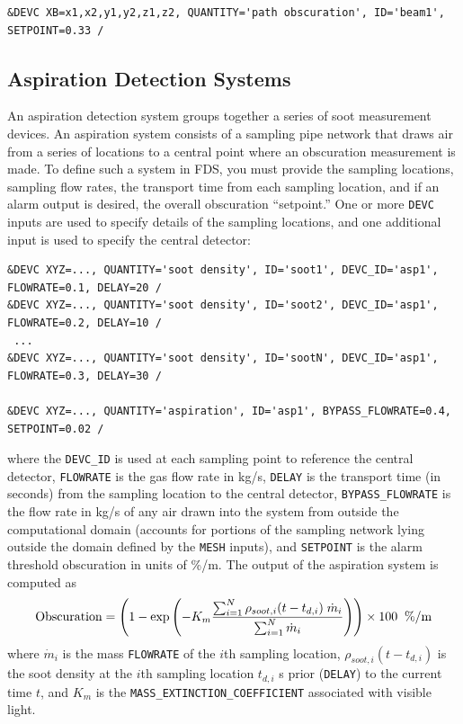 \documentclass[11pt]{book}
\newcommand{\ct}{\tt\small}
\newcommand{\dm}{\dot{m}}
\newcommand{\be}{\begin{equation}}
\newcommand{\ee}{\end{equation}}
\begin{document}
\footnotesize
\begin{verbatim}
&DEVC XB=x1,x2,y1,y2,z1,z2, QUANTITY='path obscuration', ID='beam1', SETPOINT=0.33 /
\end{verbatim}
\normalsize

\subsection{Aspiration Detection Systems}
\label{info:aspiration_detector}

An aspiration detection system groups together a series of soot measurement devices.
An aspiration system consists of a sampling pipe network that draws air from a series of locations to a central point
where an obscuration measurement is made.  To define such a system in FDS, you must provide the sampling locations,
sampling flow rates, the transport time from each sampling location, and if an alarm output is desired, the overall obscuration
``setpoint.''  One or more {\ct DEVC} inputs are used to specify details of the sampling locations, and one additional input is
used to specify the central detector:

\footnotesize
\begin{verbatim}
&DEVC XYZ=..., QUANTITY='soot density', ID='soot1', DEVC_ID='asp1', FLOWRATE=0.1, DELAY=20 /
&DEVC XYZ=..., QUANTITY='soot density', ID='soot2', DEVC_ID='asp1', FLOWRATE=0.2, DELAY=10 /
 ...
&DEVC XYZ=..., QUANTITY='soot density', ID='sootN', DEVC_ID='asp1', FLOWRATE=0.3, DELAY=30 /

&DEVC XYZ=..., QUANTITY='aspiration', ID='asp1', BYPASS_FLOWRATE=0.4, SETPOINT=0.02 /
\end{verbatim}
\normalsize

\noindent
where the {\ct DEVC\_ID} is used at each sampling point to reference the central detector, {\ct FLOWRATE} is the gas
flow rate in kg/s, {\ct DELAY} is the transport time (in seconds) from the sampling location to the central detector,
{\ct BYPASS\_FLOWRATE} is the flow rate in kg/s of any air drawn into the system from outside the computational
domain (accounts for portions of the sampling network lying outside the domain defined by the {\ct MESH}
inputs), and {\ct SETPOINT} is the alarm threshold obscuration in units of \%/m. The output of the aspiration system is
computed as
\be
  \hbox{Obscuration}  = \left(1 - \exp \left( -K_m \frac {\sum_{i=1}^N {\rho_{soot,i}( t-t_{d,i}) \; \dm_i}} {\sum_{i=1}^N{ \dm_i} } \right)  \right) \times 100  \; \; \hbox{\%/m}
\ee
where $\dm_i$ is the mass {\ct FLOWRATE} of the $i$th sampling location, $\rho_{soot,i}( t-t_{d,i})$ is the soot density at
the $i$th sampling location $t_{d,i}$ s prior ({\ct DELAY}) to the current time $t$, and $K_m$ is the {\ct MASS\_EXTINCTION\_COEFFICIENT} associated with visible light.
\end{document}
